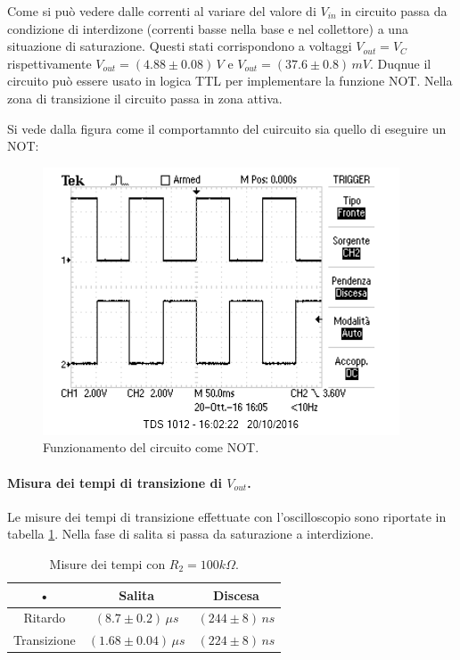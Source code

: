 \documentclass[10pt,a4paper]{article}
\begin{document}
Come si può vedere dalle correnti al variare del valore di $V_{in}$ in circuito passa da condizione di interdizone (correnti basse nella base e nel collettore) a una situazione di saturazione. Questi stati corrispondono a voltaggi $V_{out} = V_C$ rispettivamente $V_{out} = (4.88\pm0.08) \, V$ e $V_{out} = (37.6\pm0.8)\, mV$. Duqnue il circuito può essere usato in logica TTL per implementare la funzione NOT.
Nella zona di transizione il circuito passa in zona attiva.

Si vede dalla figura come il comportamnto del cuircuito sia quello di eseguire un NOT:
\begin{figure}[!htb]
  \centering
  \includegraphics[scale=0.7]{not.png} 
\caption{Funzionamento del circuito come NOT.} 
\end{figure} 


\paragraph{Misura dei tempi di transizione di $V_{out}$.}
Le misure dei tempi di transizione effettuate con l'oscilloscopio sono riportate in tabella \ref{tempi1}.
Nella fase di salita si passa da saturazione a interdizione.

\begin{table}[!htb]\centering
\begin{tabular}{|c|c|c|}
\hline 
• & Salita & Discesa \\ 
\hline 
Ritardo & $(8.7\pm0.2)\, \mu s$ & $(244\pm8) \, ns$ \\ 
\hline 
Transizione & $(1.68\pm0.04)\, \mu s$ & $(224\pm8) \, ns$ \\ 
\hline 
\end{tabular} 
\caption{Misure dei tempi con $R_2 = 100 k\Omega$.} 
\label{tempi1}
\end{table}
\end{document}
